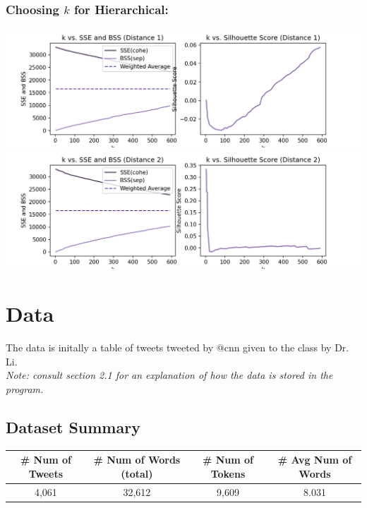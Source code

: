 \documentclass[fleqn]{article}
\begin{document}
\subsubsection{Choosing $k$ for Hierarchical:}
\begin{center}
	\includegraphics[scale=0.40]{images/d1_f_ks.png}\includegraphics[scale=0.40]{images/d2_f_ks.png}
\end{center}
\section{Data}
The data is initally a table of tweets tweeted by @cnn given to the class by Dr. Li.\\
\textit{Note: consult section 2.1 for an explanation of how the data is stored in the program.}
\subsection{Dataset Summary}
\begin{tabular}{|c|c|c|c|}
	\hline
	\textbf{\# Num of Tweets} & \textbf{\# Num of Words (total)} & \textbf{\# Num of Tokens} & \textbf{\# Avg Num of Words}\\
	\hline
	4,061&32,612&9,609&8.031\\
	\hline
\end{tabular}
\end{document}
